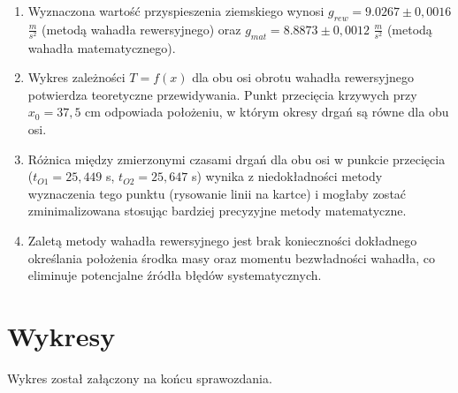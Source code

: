 \documentclass[a4paper,12pt]{article}
\begin{document}
\begin{enumerate}
  \item Wyznaczona wartość przyspieszenia ziemskiego wynosi $g_{rew} = 9.0267 \pm 0,0016$ $\frac{m}{s^2}$ (metodą wahadła rewersyjnego) oraz $g_{mat} = 8.8873 \pm 0,0012$ $\frac{m}{s^2}$ (metodą wahadła matematycznego).


  \item Wykres zależności $T=f(x)$ dla obu osi obrotu wahadła rewersyjnego potwierdza teoretyczne przewidywania. Punkt przecięcia krzywych przy $x_0 = 37,5$ cm odpowiada położeniu, w którym okresy drgań są równe dla obu osi.

  \item Różnica między zmierzonymi czasami drgań dla obu osi w punkcie przecięcia ($t_{O1} = 25,449$ s, $t_{O2} = 25,647$ s) wynika z niedokładności metody wyznaczenia tego punktu (rysowanie linii na kartce) i mogłaby zostać zminimalizowana stosując bardziej precyzyjne metody matematyczne.

  \item Zaletą metody wahadła rewersyjnego jest brak konieczności dokładnego określania położenia środka masy oraz momentu bezwładności wahadła, co eliminuje potencjalne źródła błędów systematycznych.
\end{enumerate}

\section{Wykresy}

Wykres został załączony na końcu sprawozdania.



\end{document}
